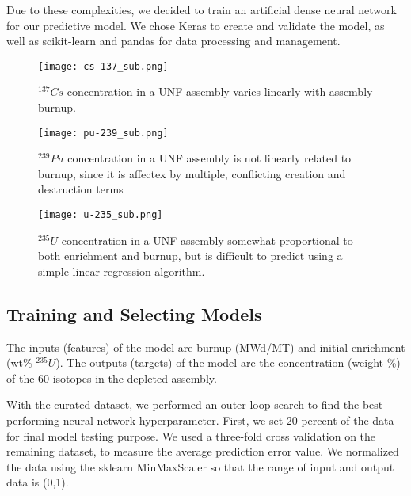 Due to these complexities, we decided to train an artificial
dense neural network for our predictive model. We chose
Keras \cite{collet_keras_2015} to create and validate the model,
as well as scikit-learn \cite{pedregosa_scikit-learn_2011}
and pandas \cite{mckinney-proc-scipy-2010} for data processing and management.

\begin{figure}
    \centering
    \texttt{[image: cs-137\_sub.png]}
    \caption{$^{137}Cs$ concentration in a \gls{UNF} assembly
             varies linearly with assembly burnup.}
    \label{fig:cs_137}
\end{figure}

\begin{figure}
    \centering
    \texttt{[image: pu-239\_sub.png]}
    \caption{$^{239}Pu$ concentration in a \gls{UNF} assembly
             is not linearly related to burnup, since it
             is affectex by multiple, conflicting creation
             and destruction terms}
    \label{fig:pu_239}
\end{figure}


\begin{figure}
    \centering
    \texttt{[image: u-235\_sub.png]}
    \caption{$^{235}U$ concentration in a \gls{UNF} assembly
             somewhat proportional to both enrichment and
             burnup, but is difficult to predict using
             a simple linear regression algorithm.}
    \label{fig:u_235}
\end{figure}


\subsection{Training and Selecting Models}

The inputs (features) of the model are
burnup (MWd/MT) and initial enrichment (wt\% $^{235}U$).
The outputs (targets) of the model are
the concentration (weight \%) of the 60 isotopes in the
depleted assembly.

With the curated dataset, we performed an outer loop
search to find the best-performing neural network
hyperparameter. First, we set 20 percent of the 
data for final model testing purpose. We used a three-fold
cross validation \cite{stone1974cross} on the remaining
dataset, to
measure the average prediction error value. We
normalized the data using the sklearn MinMaxScaler
so that the range of input and output data is (0,1).

